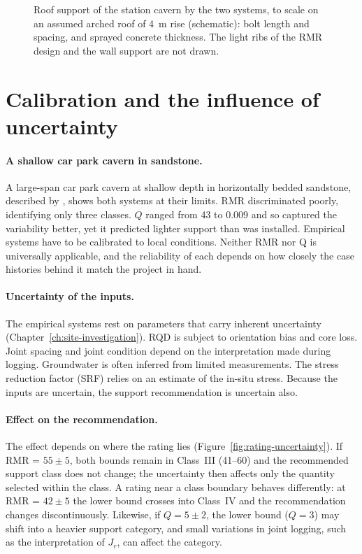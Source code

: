 \begin{figure}[htbp]
\centering
{}
\caption{Roof support of the station cavern by the two systems, to scale on an assumed arched roof of 4~m rise (schematic): bolt length and spacing, and sprayed concrete thickness. The light ribs of the RMR design and the wall support are not drawn.}
\label{fig:station-cavern-support}
\end{figure}

\section{Calibration and the influence of uncertainty}
\label{sec:case-study-and-the-influence-of-uncertainty}

\paragraph{A shallow car park cavern in sandstone.}
A large-span car park cavern at shallow depth in horizontally bedded sandstone,
described by \citet{pells2002developments}, shows both systems at their
limits. RMR discriminated poorly,
identifying only three classes. $Q$ ranged from 43 to 0.009 and so captured
the variability better, yet it predicted lighter support than was
installed. Empirical systems have to be calibrated to local conditions.
Neither RMR nor Q is universally applicable, and the reliability of each
depends on how closely the case histories behind it match the project in
hand.

\paragraph{Uncertainty of the inputs.}
The empirical systems rest on parameters that carry inherent uncertainty
(Chapter~\ref{ch:site-investigation}). RQD is subject to orientation bias
and core loss. Joint spacing and joint condition depend on the
interpretation made during logging. Groundwater is often inferred from
limited measurements. The stress reduction factor (SRF) relies on an estimate
of the in-situ stress. Because the inputs are uncertain, the support
recommendation is uncertain also.

\paragraph{Effect on the recommendation.}
The effect depends on where the rating lies
(Figure~\ref{fig:rating-uncertainty}). If RMR = $55 \pm 5$, both
bounds remain in Class~III (41--60) and the recommended support class does
not change; the uncertainty then affects only the quantity selected within
the class. A rating near a class boundary behaves differently: at RMR =
$42 \pm 5$ the lower bound crosses into Class~IV and the recommendation
changes discontinuously. Likewise, if $Q = 5 \pm 2$, the lower bound
($Q = 3$) may shift into a heavier support category, and small variations in
joint logging, such as the interpretation of $J_r$, can affect the category.


